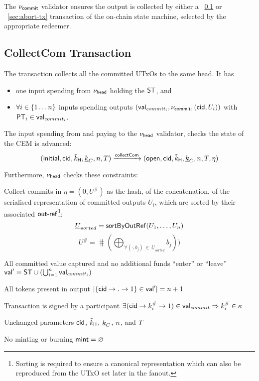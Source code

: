 \noindent The $\nu_\mathsf{commit}$ validator ensures the output is collected by either a \mtxCCom{}~\ref{sec:collect-tx} or \mtxAbort{}~\ref{sec:abort-tx} transaction of the on-chain state machine, selected by the appropriate redeemer.

\subsection{CollectCom Transaction}\label{sec:collect-tx}



\noindent The \mtxCCom{} transaction collects all the committed UTxOs to the same head. It has
\begin{itemize}
  \item one input spending from $\nu_\mathsf{head}$ holding the $\mathsf{ST}$, and
  \item $\forall i \in \{1 \dots n\}$ inputs spending \mtxCom{} outputs $(\mathsf{val}_{commit_i}, \nu_\mathsf{commit}, (\mathsf{cid}, U_{i}))$ with $\mathsf{PT}_{i} \in \mathsf{val}_{commit_{i}}$.
\end{itemize}
The input spending from and paying to the $\nu_\mathsf{head}$ validator, checks the state
of the CEM is advanced:
\[
   (\mathsf{initial},\mathsf{cid},\tilde{k}_{\mathsf{H}},\underline{k}_C,n,T) \xrightarrow{\mathsf{collectCom}} (\mathsf{open},\mathsf{cid},\tilde{k}_{\mathsf{H}},\underline{k}_C,n,T,\eta)
\]

\noindent Furthermore, $\nu_\mathsf{head}$ checks these constraints:
\begin{menumerate}
  \item Collect commits in $\eta = (0, U^{\#})$ as the hash, of the concatenation, of
  the serialised representation of committed outputs $U_{i}$, which are sorted by their associated $\mathsf{out\textsf{-}{}ref}$\footnote{Sorting is required to ensure a canonical representation which can also be reproduced from the UTxO set later in the fanout.}:  
  \[
    \underline{U}_{sorted} = \mathsf{sortByOutRef} ( U_{1}, \dots, U_{n} )
  \]
  \[
    U^{\#} = \hash(\bigoplus_{\forall (\cdot, b_{j})~\in~\underline{U}_{sorted}} b_{j}))
  \]
  \item All committed value captured and no additional funds ``enter'' or ``leave''\\
  $\mathsf{val}' = \mathsf{ST} \cup (\bigcup_{i=1}^{n} \mathsf{val}_{commit_i})$
  \item All tokens present in output
  $|\{\mathsf{cid} \rightarrow . \rightarrow 1\} \in \mathsf{val}'| = n + 1$
  \item Transaction is signed by a participant $\exists (\mathsf{cid} \rightarrow k^{\#}_{i} \rightarrow 1) \in \mathsf{val}_{commit} \Rightarrow k^{\#}_{i} \in \kappa$
  \item Unchanged parameters $\mathsf{cid}$, $\tilde{k}_{\mathsf{H}}$, $\underline{k}_C$, $n$, and
  $T$ 
  \item No minting or burning  $\mathsf{mint} = \varnothing$
\end{menumerate}

